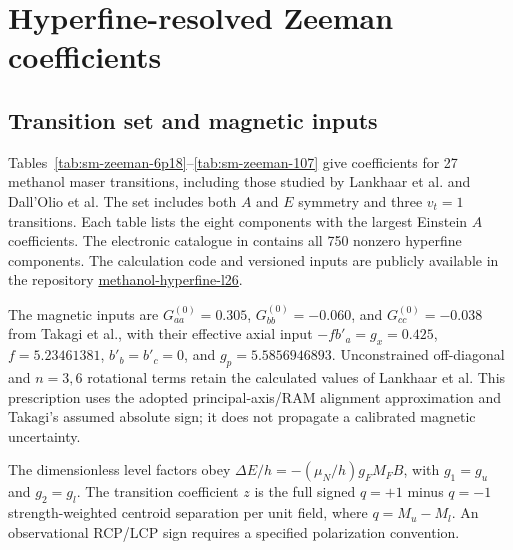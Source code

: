 \section{Hyperfine-resolved Zeeman coefficients}\label{sec:sm-zeeman}\label{sec:supp-zeeman}
\subsection{Transition set and magnetic inputs}
Tables~\ref{tab:sm-zeeman-6p18}--\ref{tab:sm-zeeman-107} give
coefficients for 27 methanol maser transitions, including those studied
by Lankhaar et al.\cite{Lankhaar2018Zeeman} and
Dall'Olio et al.\cite{DallOlio2020}
The set includes both $A$ and $E$ symmetry and three $v_t=1$ transitions.
Each table lists the eight
components with the largest Einstein $A$ coefficients.
The electronic catalogue in  contains all 750 nonzero hyperfine components. The calculation code and versioned inputs are publicly available in the repository \href{https://github.com/blankhaar/methanol-hyperfine-l26}{methanol-hyperfine-l26}.

The magnetic inputs are $G_{aa}^{(0)}=0.305$, $G_{bb}^{(0)}=-0.060$, and $G_{cc}^{(0)}=-0.038$ from Takagi et al., with their effective axial input $-f b'_a=g_x=0.425$, $f=5.23461381$, $b'_b=b'_c=0$, and $g_p=5.5856946893$.\cite{Takagi2021} Unconstrained off-diagonal and $n=3,6$ rotational terms retain the calculated values of Lankhaar et al.\cite{Lankhaar2018Zeeman} This prescription uses the adopted principal-axis/RAM alignment approximation and Takagi's assumed absolute sign; it does not propagate a calibrated magnetic uncertainty.

The dimensionless level factors obey $\Delta E/h=-(\mu_N/h)g_FM_FB$, with $g_1=g_u$ and $g_2=g_l$. The transition coefficient $z$ is the full signed $q=+1$ minus $q=-1$ strength-weighted centroid separation per unit field, where $q=M_u-M_l$. An observational RCP/LCP sign requires a specified polarization convention.

